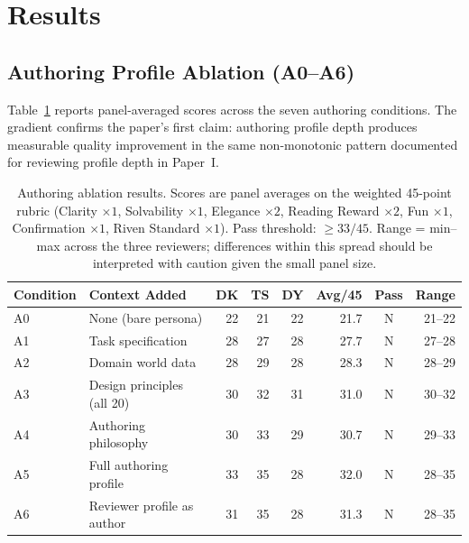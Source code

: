 \section{Results}

\subsection{Authoring Profile Ablation (A0--A6)}

Table~\ref{tab:ablation} reports panel-averaged scores across the seven authoring conditions. The gradient confirms the paper's first claim: authoring profile depth produces measurable quality improvement in the same non-monotonic pattern documented for reviewing profile depth in Paper~I.

\begin{table}[h]
\centering
\caption{Authoring ablation results. Scores are panel averages on the weighted 45-point rubric (Clarity $\times 1$, Solvability $\times 1$, Elegance $\times 2$, Reading Reward $\times 2$, Fun $\times 1$, Confirmation $\times 1$, Riven Standard $\times 1$). Pass threshold: $\geq 33/45$. Range = min--max across the three reviewers; differences within this spread should be interpreted with caution given the small panel size.}
\label{tab:ablation}
\begin{tabular}{llrrrrcr}
\toprule
Condition & Context Added & DK & TS & DY & Avg/45 & Pass & Range \\
\midrule
A0 & None (bare persona) & 22 & 21 & 22 & 21.7 & N & 21--22 \\
A1 & Task specification & 28 & 27 & 28 & 27.7 & N & 27--28 \\
A2 & Domain world data & 28 & 29 & 28 & 28.3 & N & 28--29 \\
A3 & Design principles (all 20) & 30 & 32 & 31 & 31.0 & N & 30--32 \\
A4 & Authoring philosophy & 30 & 33 & 29 & 30.7 & N & 29--33 \\
A5 & Full authoring profile & 33 & 35 & 28 & 32.0 & N & 28--35 \\
A6 & Reviewer profile as author & 31 & 35 & 28 & 31.3 & N & 28--35 \\
\bottomrule
\end{tabular}
\end{table}


